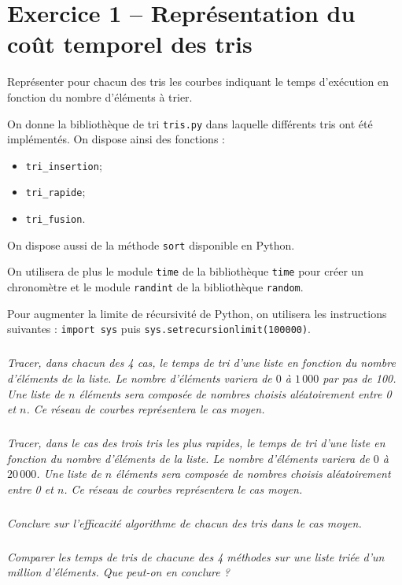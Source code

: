 \section*{Exercice 1 -- Représentation du coût temporel des tris}


\ifprof
\else

\begin{obj}
Représenter pour chacun des tris les courbes indiquant le temps d'exécution en fonction du nombre d'éléments à trier.
\end{obj}
On donne la bibliothèque de tri \texttt{tris.py} dans laquelle différents tris ont été implémentés.
On dispose ainsi des fonctions : 
\begin{itemize}
\item \texttt{tri\_insertion};
\item \texttt{tri\_rapide};
\item \texttt{tri\_fusion}.
\end{itemize}
On dispose aussi de la méthode \texttt{sort} disponible en Python.

On utilisera de plus le module \texttt{time} de la bibliothèque \texttt{time} pour créer un chronomètre et le module \texttt{randint} de la bibliothèque \texttt{random}.

Pour augmenter la limite de récursivité de Python, on utilisera les instructions suivantes : \texttt{import sys} puis \texttt{sys.setrecursionlimit(100000)}.

\subparagraph{}
\textit{Tracer, dans chacun des 4 cas, le temps de tri d'une liste en fonction du nombre d'éléments de la liste. Le nombre d'éléments variera de $0$ à $1\, 000$ par pas de 100. Une liste de $n$ éléments sera composée de nombres choisis aléatoirement entre 0 et $n$. Ce réseau de courbes représentera le cas moyen.}

\subparagraph{}
\textit{Tracer, dans le cas des trois tris les plus rapides, le temps de tri d'une liste en fonction du nombre d'éléments de la liste. Le nombre d'éléments variera de $0$ à $20\, 000$. Une liste de $n$ éléments sera composée de nombres choisis aléatoirement entre 0 et $n$. Ce réseau de courbes représentera le cas moyen.}

\subparagraph{}
\textit{Conclure sur l'efficacité algorithme de chacun des tris dans le cas moyen.}

\subparagraph{}
\textit{Comparer les temps de tris de chacune des 4 méthodes sur une liste triée d'un million d'éléments. Que peut-on en conclure ?}


\fi


